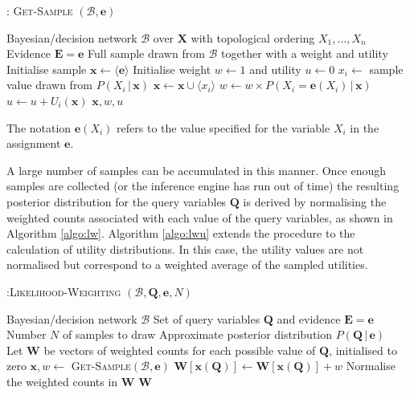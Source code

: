 \begin{algorithm}[h!]
\caption{: \textsc{Get-Sample} $(\mathcal{B}, \mathbf{e})$}
\begin{algorithmic}[1] \vspace{2mm} 
\REQUIRE Bayesian/decision network $\mathcal{B}$ over $\mathbf{X}$ with topological ordering $X_1, \dots, X_n$
\REQUIRE Evidence $\mathbf{E} =\mathbf{e}$
\ENSURE Full sample drawn from $\mathcal{B}$ together with a weight and utility \\[2mm]
\STATE Initialise sample $\mathbf{x} \leftarrow \langle \mathbf{e} \rangle$
\STATE Initialise weight $w \leftarrow 1$ and utility $u \leftarrow 0$
\STATE $x_i \leftarrow$ sample value drawn from $P(X_i  \, | \,  \mathbf{x})$
\STATE $\mathbf{x} \leftarrow \mathbf{x} \cup \langle x_i \rangle$
\STATE $w \leftarrow w \times P\left(X_i = \mathbf{e}(X_i)  \, | \,  \mathbf{x}\right)$
\STATE $u \leftarrow u + U_i(\mathbf{x})$
\ENDIF
\ENDFOR
\RETURN $\mathbf{x}, w, u$
\end{algorithmic}
\label{algo:getsample}
\end{algorithm}

The notation $\mathbf{e}(X_i)$ refers to the value specified for the variable $X_i$ in the assignment $\mathbf{e}$. 

A large number of samples can be accumulated in this manner. Once enough samples are collected (or the inference engine has run out of time) the resulting posterior distribution for the query variables $\mathbf{Q}$ is derived by normalising the weighted counts associated with each value of the query variables, as shown in Algorithm \ref{algo:lw}. Algorithm \ref{algo:lwu} extends the procedure to the calculation of utility distributions. In this case, the utility values are not normalised but correspond to a weighted average of the sampled utilities. 

\begin{algorithm}[h]
\caption{:\textsc{Likelihood-Weighting} $(\mathcal{B},\mathbf{Q}, \mathbf{e}, N)$}
\begin{algorithmic} \vspace{2mm} 
\REQUIRE Bayesian/decision network $\mathcal{B}$
\REQUIRE Set of query variables $\mathbf{Q}$ and evidence $\mathbf{E} =\mathbf{e}$
\REQUIRE Number $N$ of samples to draw
\ENSURE Approximate posterior distribution $P(\mathbf{Q} \, | \, \mathbf{e})$ \\[2mm]
\STATE Let $\mathbf{W}$ be vectors of weighted counts for each possible value of $\mathbf{Q}$, initialised to zero
\STATE $\mathbf{x}, w \leftarrow $ \textsc{Get-Sample}$(\mathcal{B}, \mathbf{e})$ 
\STATE $\mathbf{W}[\mathbf{x}(\mathbf{Q})] \leftarrow \mathbf{W}[\mathbf{x}(\mathbf{Q})] + w$
\ENDFOR
\STATE Normalise the weighted counts in $\mathbf{W}$
\RETURN $\mathbf{W}$  \vspace{1mm} 
\end{algorithmic}
\label{algo:lw}
\end{algorithm}


